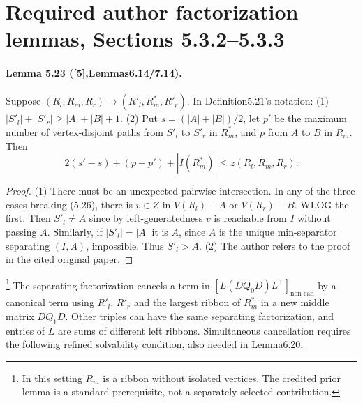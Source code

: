 \section*{Required author factorization lemmas, Sections 5.3.2--5.3.3}
\paragraph{Lemma 5.23 ([5],Lemmas6.14/7.14).} Suppose $(R_l,R_m,R_r)\to(R'_l,R^*_m,R'_r)$. In Definition5.21's notation: (1) $|S'_l|+|S'_r|\ge|A|+|B|+1$. (2) Put $s=(|A|+|B|)/2$, let $p'$ be the maximum number of vertex-disjoint paths from $S'_l$ to $S'_r$ in $R^*_m$, and $p$ from $A$ to $B$ in $R_m$. Then
\[2(s'-s)+(p-p')+|I(R^*_m)|\le z(R_l,R_m,R_r).\]
\begin{proof}(1) There must be an unexpected pairwise intersection. In any of the three cases breaking (5.26), there is $v\in Z$ in $V(R_l)-A$ or $V(R_r)-B$. WLOG the first. Then $S'_l\ne A$ since by left-generatedness $v$ is reachable from $I$ without passing $A$. Similarly, if $|S'_l|=|A|$ it is $A$, since $A$ is the unique min-separator separating $(I,A)$, impossible. Thus $S'_l>A$. (2) The author refers to the proof in the cited original paper.\end{proof}
\footnote{In this setting $R_m$ is a ribbon without isolated vertices. The credited prior lemma is a standard prerequisite, not a separately selected contribution.}
The separating factorization cancels a term in $[L(DQ_0D)L^\top]_{\mathrm{non\text{-}can}}$ by a canonical term using $R'_l$, $R'_r$ and the largest ribbon of $R^*_m$ in a new middle matrix $DQ_1D$. Other triples can have the same separating factorization, and entries of $L$ are sums of different left ribbons. Simultaneous cancellation requires the following refined solvability condition, also needed in Lemma6.20.
